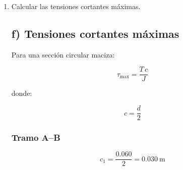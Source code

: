 \documentclass[12pt,a4paper]{article}
\begin{document}
\begin{enumerate}
\begin{figure}[H]
\caption{Variación del ángulo de giro a lo largo del eje en el Ejercicio 2.}
\label{fig:giro_ej2}
\end{figure}
\subsubsection*{Interpretación gráfica}

El diagrama de giro muestra una variación lineal por tramos, con valor nulo en ambos empotramientos y máximo en la sección B. El cambio de pendiente entre A--B y B--C refleja la diferencia de rigidez torsional entre ambos segmentos.
\subsubsection*{Interpretación}

El máximo giro aparece en la sección de aplicación del par, ya que la rotación es nula en los empotramientos y la deformación angular se acumula entre los extremos y la sección cargada.

\item[f)] Calcular las tensiones cortantes máximas.

\subsection*{f) Tensiones cortantes máximas}

Para una sección circular maciza:

\begin{equation}
\tau_{\max}=\frac{T\,c}{J}
\end{equation}

donde:

\[
c=\frac{d}{2}
\]

\subsubsection*{Tramo A--B}

\begin{equation}
c_1=\frac{0.060}{2}=0.030\ \text{m}
\end{equation}


\end{enumerate}
\end{document}
